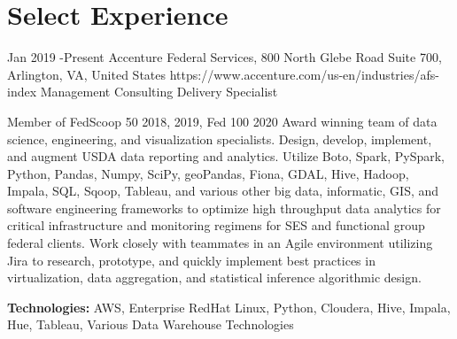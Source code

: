 \documentclass[10pt]{article} %
\begin{document}

\section{Select Experience}

\job
{Jan 2019 -}{Present}
{Accenture Federal Services, 800 North Glebe Road Suite 700, Arlington, VA, United States}
{https://www.accenture.com/us-en/industries/afs-index}
{Management Consulting Delivery Specialist}
{Member of FedScoop 50 2018, 2019, Fed 100 2020 Award winning team of data science, engineering, and visualization specialists. Design, develop, implement, and augment USDA data reporting and analytics.
Utilize Boto, Spark, PySpark, Python, Pandas, Numpy, SciPy, geoPandas, Fiona, GDAL, Hive, Hadoop, Impala, SQL, Sqoop, Tableau, and various other big data, informatic, GIS, and software engineering frameworks to optimize high throughput data analytics for critical infrastructure and monitoring regimens for SES and functional group federal clients. Work closely with teammates in an Agile environment utilizing Jira to research, prototype, and quickly implement best practices in virtualization, data aggregation, and statistical inference algorithmic design.\\
\rule{0mm}{5mm}\textbf{Technologies:} AWS, Enterprise RedHat Linux, Python, Cloudera, Hive, Impala, Hue, Tableau, Various Data Warehouse Technologies}

\end{document}
